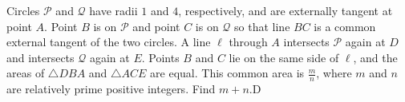 Circles $\mathcal{P}$ and $\mathcal{Q}$ have radii $1$ and $4$,  respectively, and are externally tangent at point $A$. Point $B$ is on $\mathcal{P}$ and point $C$ is on $\mathcal{Q}$ so that line $BC$ is a common external tangent of the two circles. A line $\ell$ through $A$ intersects $\mathcal{P}$ again at $D$ and intersects $\mathcal{Q}$ again at $E$. Points $B$ and $C$ lie on the same side of $\ell$,  and the areas of $\triangle DBA$ and $\triangle ACE$ are equal. This common area is $\frac{m}{n}$,  where $m$ and $n$ are relatively prime positive integers. Find $m+n$.D